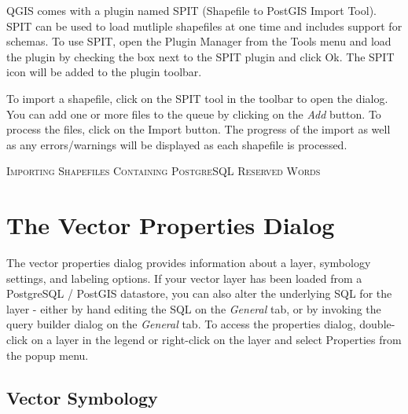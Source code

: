 QGIS comes with a
plugin named SPIT (Shapefile to PostGIS Import Tool).
SPIT can be used to load mutliple shapefiles at one time and includes support
for schemas. To use SPIT, open the Plugin Manager from the Tools menu and load
the plugin by checking the box next to the SPIT plugin and click Ok. The SPIT
icon will be added to the plugin toolbar. 

To import a shapefile, click on the SPIT tool in the toolbar to open the dialog.
You can add one or more files to the queue by clicking on the \textsl{Add}
button. To process the files, click on the Import button. The progress of the
import as well as any errors/warnings will be displayed as each shapefile is
processed.  
\begin{Tip}\caption{\textsc{Importing Shapefiles Containing
PostgreSQL Reserved Words}}
\end{Tip} 
\section{The Vector Properties
Dialog}\label{sec:vectorprops}
The vector properties dialog provides information about a layer, symbology
settings, and labeling options. If your vector layer has been loaded from a
PostgreSQL / PostGIS datastore, you can also alter the underlying SQL for the
layer - either by hand editing the SQL on the \textit{General} tab, or by invoking the
query builder dialog on the \textit{General} tab. To access the properties dialog,
double-click on a layer in the legend or right-click on the layer and select
Properties from the popup menu.

\subsection{Vector Symbology}\label{sec:symbology}

